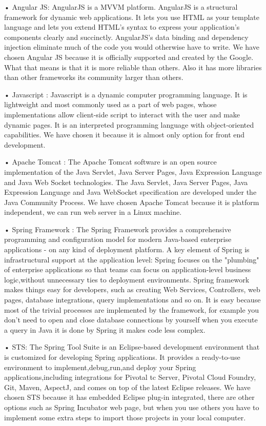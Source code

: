 • Angular JS: AngularJS is a MVVM platform.  AngularJS is a structural framework for dynamic web applications. It lets you use HTML as your template language and lets you extend HTML’s syntax to express your application's components clearly and succinctly. AngularJS’s data binding and dependency injection eliminate much of the code you would otherwise have to write. \cite{AngularJSTanim}
 We have chosen Angular JS because it is officially supported and created by the Google. What that means is that it is more reliable than others. Also it has more libraries than other frameworks its community larger than others.

• Javascript : Javascript is a dynamic computer programming language. It is lightweight and most commonly used as a part of web pages, whose implementations allow client-side script to interact with the user and make dynamic pages. It is an interpreted programming language with object-oriented capabilities. \cite{JavascriptTanim}
 We have chosen it because it is almost only option for front end development. 

• Apache Tomcat : The Apache Tomcat software is an open source implementation of the Java Servlet, Java Server Pages, Java Expression Language and Java Web Socket technologies. The Java Servlet, Java Server Pages, Java Expression Language and Java WebSocket specification are developed under the Java Community Process. \cite{TomcatTanim}
 We have chosen Apache Tomcat because it is platform independent, we can run web server in a Linux machine. 

• Spring Framework :  The Spring Framework provides a comprehensive programming and configuration model for modern Java-based enterprise applications - on any kind of deployment platform.
\cite{SpringFrameTanim}
 A key element of Spring is infrastructural support at the application level: Spring focuses on the "plumbing" of enterprise applications so that teams can focus on application-level business logic,without unnecessary ties to deployment environments. Spring framework makes things easy for developers, such as creating Web Services, Controllers, web pages, database integrations, query implementations and so on. It is easy because most of the trivial processes are implemented by the framework, for example you don't need to open and close database connections by yourself when you execute a query in Java it is done by Spring it makes code less complex.

• STS: The Spring Tool Suite is an Eclipse-based development environment that is customized for developing Spring applications. It provides a ready-to-use environment to implement,debug,run,and deploy your Spring applications,including integrations for Pivotal tc Server, Pivotal Cloud Foundry, Git, Maven, AspectJ, and comes on top of the latest Eclipse releases. 
\cite{STSTanim}
We have chosen STS because it has embedded Eclipse plug-in integrated, there are other options such as Spring Incubator web page, but when you use others you have to implement some extra steps to import those projects in your local computer.

